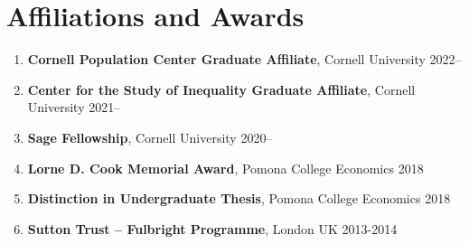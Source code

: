 \documentclass[letterpaper,11pt,oneside]{article}
\begin{document}
\section*{Affiliations and Awards}
\begin{enumerate}[itemsep=2pt, label={}]
    \item \textbf{Cornell Population Center Graduate Affiliate}, Cornell University 2022--
    \item \textbf{Center for the Study of Inequality Graduate Affiliate}, Cornell University 2021--
    \item \textbf{Sage Fellowship}, Cornell University 2020--
    \item \textbf{Lorne D. Cook Memorial Award}, Pomona College Economics 2018
    \item \textbf{Distinction in Undergraduate Thesis}, Pomona College Economics 2018
    \item \textbf{Sutton Trust -- Fulbright Programme}, London UK 2013-2014  
\end{enumerate}
\end{document}
